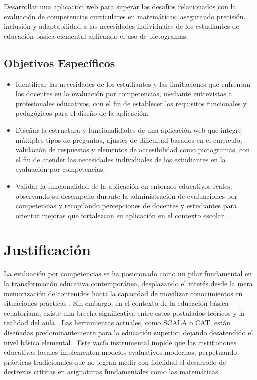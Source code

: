 Desarrollar una aplicación web para superar los desafíos relacionados con la evaluación de competencias curriculares en matemáticas, asegurando precisión, inclusión y adaptabilidad a las necesidades individuales de los estudiantes de educación básica elemental aplicando el uso de pictogramas.

\subsection{Objetivos Específicos}

\begin{itemize}[leftmargin=*]
  \item Identificar las necesidades de los estudiantes y las limitaciones que enfrentan los docentes en la evaluación por competencias, mediante entrevistas a profesionales educativos, con el fin de establecer los requisitos funcionales y pedagógicos para el diseño de la aplicación.
  \item Diseñar la estructura y funcionalidades de una aplicación web que integre múltiples tipos de preguntas, ajustes de dificultad basados en el currículo, validación de respuestas y elementos de accesibilidad como pictogramas, con el fin de atender las necesidades individuales de los estudiantes en la evaluación por competencias.
  \item Validar la funcionalidad de la aplicación en entornos educativos reales, observando su desempeño durante la administración de evaluaciones por competencias y recopilando percepciones de docentes y estudiantes para orientar mejoras que fortalezcan su aplicación en el contexto escolar.
\end{itemize}

\section{Justificación}

La evaluación por competencias se ha posicionado como un pilar fundamental en la transformación educativa contemporánea, desplazando el interés desde la mera memorización de contenidos hacia la capacidad de movilizar conocimientos en situaciones prácticas \cite{black1998inside,oecd2019compass,voinea2025competency}. Sin embargo, en el contexto de la educación básica ecuatoriana, existe una brecha significativa entre estos postulados teóricos y la realidad del aula \cite{velezvelez2024curriculo,niss2019math,velezvelez2024curriculo}. Las herramientas actuales, como SCALA o CAT, están diseñadas predominantemente para la educación superior, dejando desatendido el nivel básico elemental \cite{gonzalez2021ai}. Este vacío instrumental impide que las instituciones educativas locales implementen modelos evaluativos modernos, perpetuando prácticas tradicionales que no logran medir con fidelidad el desarrollo de destrezas críticas en asignaturas fundamentales como las matemáticas.

